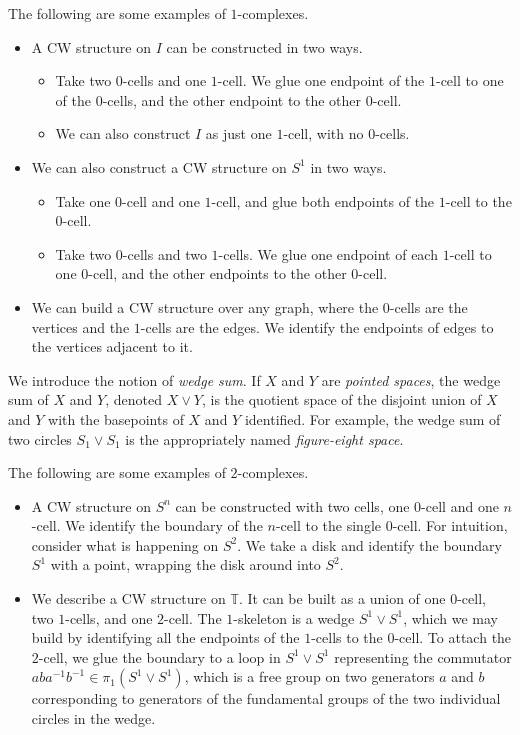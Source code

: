 \begin{example}[$1$-complexes]
  The following are some examples of $1$-com\-plex\-es.
  \begin{itemize}
    \item A CW structure on $I$ can be constructed in two ways.
          \begin{itemize}
            \item Take two $0$-cells and one $1$-cell. We glue one endpoint of the $1$-cell to one of the $0$-cells, and the other endpoint to the other $0$-cell.
            \item We can also construct $I$ as just one $1$-cell, with no $0$-cells.
          \end{itemize}
    \item We can also construct a CW structure on $S^1$ in two ways.
          \begin{itemize}
            \item Take one $0$-cell and one $1$-cell, and glue both endpoints of the $1$-cell to the $0$-cell.
            \item Take two $0$-cells and two $1$-cells. We glue one endpoint of each $1$-cell to one $0$-cell, and the other endpoints to the other $0$-cell.
          \end{itemize}
    \item We can build a CW structure over any graph, where the $0$-cells are the vertices and the $1$-cells are the edges. We identify the endpoints of edges to the vertices adjacent to it.
  \end{itemize}
\end{example}

We introduce the notion of \emph{wedge sum}. If $X$ and $Y$ are \emph{pointed spaces}, the wedge sum of $X$ and $Y$, denoted $X \vee Y$, is the quotient space of the disjoint union of $X$ and $Y$ with the basepoints of $X$ and $Y$ identified. For example, the wedge sum of two circles $S_1 \vee S_1$ is the appropriately named \emph{figure-eight space}.

\begin{example}[$2$-complexes]
  The following are some examples of $2$-com\-plex\-es.
  \begin{itemize}
    \item A CW structure on $S^n$ can be constructed with two cells, one $0$-cell and one $n$-cell. We identify the boundary of the $n$-cell to the single $0$-cell. For intuition, consider what is happening on $S^2$. We take a disk and identify the boundary $S^1$ with a point, wrapping the disk around into $S^2$.
    \item We describe a CW structure on $\mathbb T$. It can be built as a union of one $0$-cell, two $1$-cells, and one $2$-cell. The $1$-skeleton is a wedge $S^1 \vee S^1$, which we may build by identifying all the endpoints of the $1$-cells to the $0$-cell. To attach the $2$-cell, we glue the boundary to a loop in $S^1 \vee S^1$ representing the commutator $aba^{-1}b^{-1} \in \pi_1(S^1 \vee S^1)$, which is a free group on two generators $a$ and $b$ corresponding to generators of the fundamental groups of the two individual circles in the wedge.
  \end{itemize}
\end{example}

